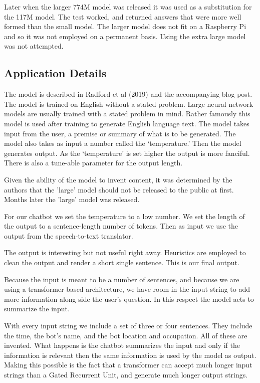 Later when the larger 774M model was released it was used as a substitution for the 117M model. The test worked, and returned answers that were more well formed than the small model. The larger model does not fit on a Raspberry Pi and so it was not employed on a permanent basis. Using the extra large model was not attempted.

\subsection*{Application Details}
The model is described in Radford et al (2019)\cite{radford2019language} and the accompanying blog post. The model is trained on English without a stated problem. Large neural network models are usually trained with a stated problem in mind. Rather famously this model is used after training to generate English language text. The model takes input from the user, a premise or summary of what is to be generated. The model also takes as input a number called the `temperature.' Then the model generates output. As the `temperature' is set higher the output is more fanciful. There is also a tune-able parameter for the output length. 

Given the ability of the model to invent content, it was determined by the authors that the 'large' model should not be released to the public at first. Months later the 'large' model was released. 

For our chatbot we set the temperature to a low number. We set the length of the output to a sentence-length number of tokens. Then as input we use the output from the speech-to-text translator.

The output is interesting but not useful right away. Heuristics are employed to clean the output and render a short single sentence. This is our final output.

Because the input is meant to be a number of sentences, and because we are using a transformer-based architecture, we have room in the input string to add more information along side the user's question. In this respect the model acts to summarize the input. 

With every input string we include a set of three or four sentences. They include the time, the bot's name, and the bot location and occupation. All of these are invented. What happens is the chatbot summarizes the input and only if the information is relevant then the same information is used by the model as output. Making this possible is the fact that a transformer can accept much longer input strings than a Gated Recurrent Unit, and generate much longer output strings.